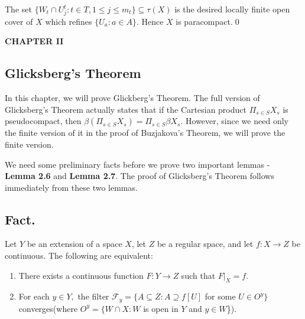 \documentclass{article}
\begin{document}
		  \vskip 20pt

		  The set $\{W_t \cap U_j^t: t\in T, 1 \leq j \leq m_t \} \subseteq \tau(X)$ is the desired locally finite open cover of $X$ which refines $\{U_a: a \in A\}$. Hence $X$ is paracompact.\qed









		  \newpage











		  \begin{center}
		  \textbf{CHAPTER II}
		  \end{center}
		  \vskip 40pt
		  \begin{center}
		  \section{Glicksberg's Theorem}
		  \end{center}

		  \vskip 20pt

		  In this chapter, we will prove Glickberg's Theorem. The full version of Glicksberg's Theorem actually states that if the Cartesian product $\Pi_{s\in S} X_s$ is pseudocompact, then $\beta \left(\Pi_{s\in S} X_s\right) = \Pi_{s\in S} \beta X_s.$ However, since we need only the finite version of it in the proof of Buzjakova's Theorem, we will prove the finite version. 

		  \vskip 20pt
		  We  need some preliminary facts before we prove two important lemmas - \textbf{Lemma 2.6} and \textbf{Lemma 2.7}. The proof of Glicksberg's Theorem follows immediately from these two lemmas.


		  \vskip 25pt

		  \subsection{Fact.}  Let $Y$ be an extension of a space $X$, let $Z$ be a regular space, and let $f:X \rightarrow Z$ be continuous. The following are equivalent: 
		  \begin{enumerate}
		  \item There exists a continuous function $F: Y\rightarrow Z$ such that $F|_X=f.$
		  \item For each $y\in Y,$ the filter $\mathcal{F}_y=\{A\subseteq Z: A\supseteq f[U]$ for some $U\in O^y\}$ converges(where $O^y=\{W\cap X: W$ is open in $Y$ and $y\in W$\}).

		  \end{enumerate}
\end{document}
